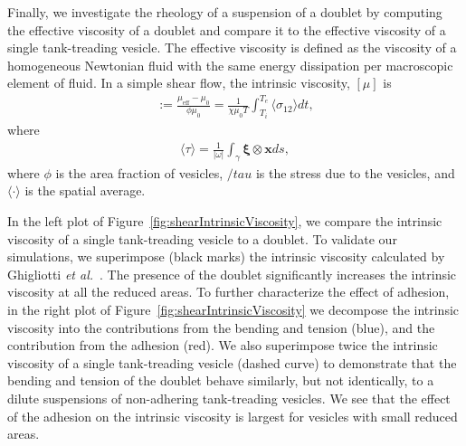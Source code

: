 \documentclass[prf,superscriptaddress,showpacs]{revtex4-1}
\newcommand{\xx}{\mathbf{x}}
\newcommand{\xxi}{\boldsymbol{\xi}}
\begin{document}
Finally, we investigate the rheology of a suspension of a doublet by
computing the effective viscosity of a doublet and compare it to the
effective viscosity of a single tank-treading vesicle. The effective
viscosity is defined as the viscosity of a homogeneous Newtonian fluid
with the same energy dissipation per macroscopic element of fluid.  In a
simple shear flow, the intrinsic viscosity, $[\mu]$ is
\begin{align*}
  [\mu]:= \frac{\mu_{\mathrm{eff}} - \mu_0}{\phi \mu_0} = 
  \frac{1}{\chi \mu_0 T} \int_{T_i}^{T_e} 
  \langle \sigma_{12} \rangle dt,
\end{align*}
where
\begin{align*}
  \langle \tau \rangle = \frac{1}{|\omega|} \int_{\gamma}
    \xxi \otimes \xx ds,
\end{align*}
where $\phi$ is the area fraction of vesicles, $/tau$ is the stress due
to the vesicles, and $\langle \cdot \rangle$ is the spatial average.

In the left plot of Figure~\ref{fig:shearIntrinsicViscosity}, we compare
the intrinsic viscosity of a single tank-treading vesicle to a doublet.
To validate our simulations, we superimpose (black marks) the intrinsic
viscosity calculated by Ghigliotti {\em et
al.}~\cite{GhigliottiBibenMisbah2010_JFM}.  The presence of the doublet
significantly increases the intrinsic viscosity at all the reduced
areas.  To further characterize the effect of adhesion, in the right
plot of Figure~\ref{fig:shearIntrinsicViscosity} we decompose the
intrinsic viscosity into the contributions from the bending and tension
(blue), and the contribution from the adhesion (red).  We also
superimpose twice the intrinsic viscosity of a single tank-treading
vesicle (dashed curve) to demonstrate that the bending and tension of
the doublet behave similarly, but not identically, to a dilute
suspensions of non-adhering tank-treading vesicles.  We see that the
effect of the adhesion on the intrinsic viscosity is largest for
vesicles with small reduced areas.
\end{document}

